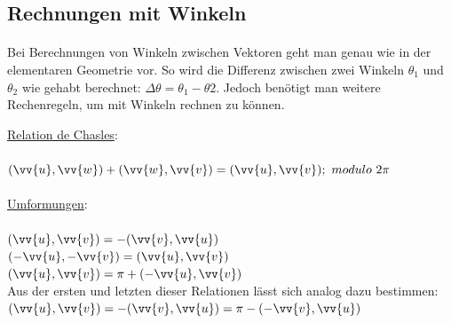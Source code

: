     \subsection{Rechnungen mit Winkeln}

        \paragraph{} Bei Berechnungen von Winkeln zwischen Vektoren geht man genau wie in der elementaren Geometrie vor.
         So wird die Differenz zwischen zwei Winkeln $\theta_{1}$ und $\theta_{2}$ wie gehabt berechnet: $\Delta\theta = \theta_{1} - \theta{2}$.
         Jedoch benötigt man weitere Rechenregeln, um mit Winkeln rechnen zu können.
        \\
        \begin{Theorem}
            \underline{Relation de Chasles}: \\\\
            $(\vv{u},\vv{w})+(\vv{w},\vv{v})=(\vv{u},\vv{v});\text{ }modulo\text{ }2\pi$ \\\\
            \underline{Umformungen}: \\\\
            $(\vv{u},\vv{v})=-(\vv{v},\vv{u})$ \\
            $(-\vv{u},-\vv{v})=(\vv{u},\vv{v})$ \\
            $(\vv{u},\vv{v})=\pi+(-\vv{u},\vv{v})$ \\
            Aus der ersten und letzten dieser Relationen lässt sich analog dazu bestimmen: \\
            $(\vv{u},\vv{v})=-(\vv{v},\vv{u})=\pi-(-\vv{v},\vv{u})$
        \end{Theorem}

        \\
        \\
        \\

